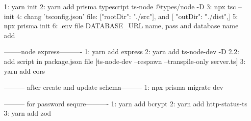 1: yarn init
2: yarn add prisma typescript ts-node @types/node -D
3: npx tsc --init
4: chang 'tsconfig.json' file: ["rootDir": "./src"],   and [ "outDir": "./dist",]
5: npx prisma init
6: .env file DATABASE_URL name, pass and database name add



--------node express----------
1: yarn add express
2: yarn add ts-node-dev -D
2.2: add script in package.json file [ts-node-dev --respawn --transpile-only server.ts]
3: yarn add cors

--------- after create and update schema---------
1: npx prisma migrate dev


--------- for password sequre----------
1: yarn add bcrypt
2: yarn add http-status-ts
3: yarn add zod